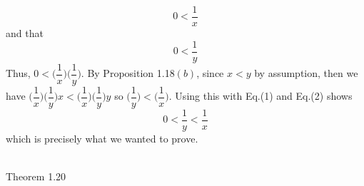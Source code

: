 \documentclass[12pt]{article}
\begin{document}
\begin{enumerate}
\begin{equation}
0< \dfrac{1}{x}
\end{equation} and that \begin{equation}
0 < \dfrac{1}{y}
\end{equation} Thus, $0< \bigg( \dfrac{1}{x} \bigg) \bigg( \dfrac{1}{y} \bigg)$. By Proposition 1.18$(b)$, since $x<y$ by assumption, then we have $ \bigg( \dfrac{1}{x} \bigg) \bigg( \dfrac{1}{y} \bigg)x < \bigg( \dfrac{1}{x} \bigg) \bigg( \dfrac{1}{y} \bigg)y$ so $ \bigg( \dfrac{1}{y} \bigg)< \bigg( \dfrac{1}{x} \bigg)$. Using this with Eq.(1) and Eq.(2) shows 
\begin{equation}
0< \dfrac{1}{y} < \dfrac{1}{x}
\end{equation}
which is precisely what we wanted to prove. \\ \\
\end{enumerate}

\problem Theorem 1.20 \\
\end{document}

